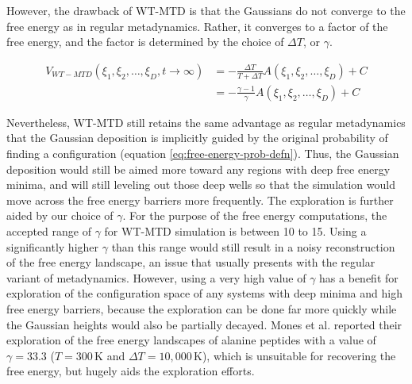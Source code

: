 \begin{spacing}{2.0}
    However, the drawback of WT-MTD is that the Gaussians do not converge to the free energy as in regular metadynamics. Rather,
    it converges to a factor of the free energy, and the factor is determined by the choice of $\Delta T$, or $\gamma$.

    \begin{equation}\begin{aligned}
        V_{WT-MTD}(\xi_1,\xi_2,\ldots,\xi_D,t\to\infty) &= -\frac{\Delta T}{T + \Delta T}A(\xi_1,\xi_2,\ldots,\xi_D) + C \\
            &= -\frac{\gamma - 1}{\gamma}A(\xi_1,\xi_2,\ldots,\xi_D) + C
    \end{aligned}\end{equation}

    Nevertheless, WT-MTD still retains the same advantage as regular metadynamics that the Gaussian deposition is implicitly guided by
    the original probability of finding a configuration (equation \ref{eq:free-energy-prob-defn}). Thus, the Gaussian deposition would
    still be aimed more toward any regions with deep free energy minima, and will still leveling out those deep wells so that the
    simulation would move across the free energy barriers more frequently. The exploration is further aided by our choice of $\gamma$.
    For the purpose of the free energy computations, the accepted range of $\gamma$ for WT-MTD simulation is between 10 to 15.
    Using a significantly higher $\gamma$ than this range would still result in a noisy reconstruction of the free energy landscape,
    an issue that usually presents with the regular variant of metadynamics. However, using a very high value of $\gamma$ has
    a benefit for exploration of the configuration space of any systems with deep minima and high free energy barriers, because
    the exploration can be done far more quickly while the Gaussian heights would also be partially decayed. Mones et al. reported
    their exploration of the free energy landscapes of alanine peptides with a value of $\gamma = 33.3$ 
    ($T = 300\,\mathrm{K}$ and $\Delta T = 10,000\,\mathrm{K}$), 
    which is unsuitable for recovering the free energy, but hugely aids the exploration efforts. \cite{P-JCTC-2016-v12-Mones}
\end{spacing}
